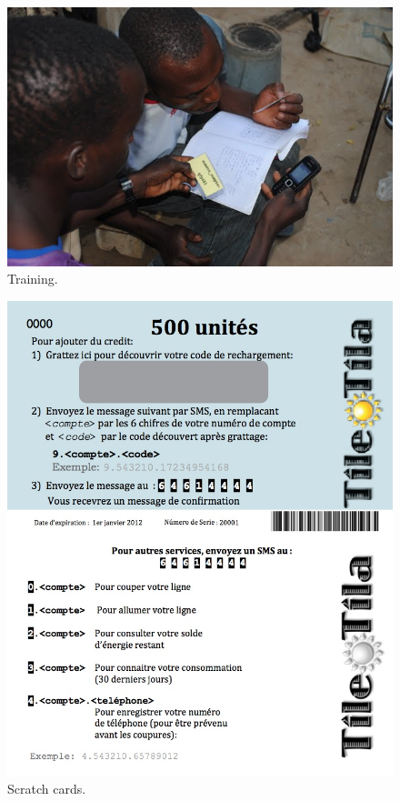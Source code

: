 \documentclass[conference]{IEEEtran}
\begin{document}
\begin{figure}[]
\begin{center}
\includegraphics[width=\columnwidth]{figures/training.jpg}
\end{center}
\caption{Training.}
\label{training}
\end{figure}

\begin{figure}[]
\begin{center}
\includegraphics[width=\columnwidth]{figures/scratchCards.jpg}
\end{center}
\caption{Scratch cards.}
\label{scratchCards}
\end{figure}
\end{document}
